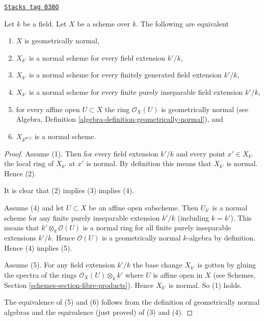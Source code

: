 \begin{lemma}
\label{varieties-lemma-geometrically-normal}
\href{https://stacks.math.columbia.edu/tag/038O}{\texttt{Stacks tag 038O}}

Let $k$ be a field.
Let $X$ be a scheme over $k$.
The following are equivalent
\begin{enumerate}
\item $X$ is geometrically normal,
\item $X_{k'}$ is a normal scheme for every field extension $k'/k$,
\item $X_{k'}$ is a normal scheme for every finitely generated field
extension $k'/k$,
\item $X_{k'}$ is a normal scheme for every finite purely inseparable
field extension $k'/k$,
\item for every affine open $U \subset X$ the ring $\mathcal{O}_X(U)$
is geometrically normal (see
Algebra, Definition \ref{algebra-definition-geometrically-normal}), and
\item $X_{k^{perf}}$ is a normal scheme.
\end{enumerate}
\end{lemma}

\begin{proof}
Assume (1). Then for every field extension $k'/k$ and
every point $x' \in X_{k'}$ the local ring of $X_{k'}$ at $x'$
is normal. By definition this means that $X_{k'}$ is normal.
Hence (2).

\medskip\noindent
It is clear that (2) implies (3) implies (4).

\medskip\noindent
Assume (4) and let $U \subset X$ be an affine open subscheme.
Then $U_{k'}$ is a normal scheme for any finite purely inseparable
extension $k'/k$ (including $k = k'$). This means that
$k' \otimes_k \mathcal{O}(U)$ is a normal ring for all
finite purely inseparable extensions $k'/k$. Hence
$\mathcal{O}(U)$ is a geometrically normal $k$-algebra by definition.
Hence (4) implies (5).

\medskip\noindent
Assume (5). For any field extension $k'/k$ the base
change $X_{k'}$ is gotten by gluing the spectra of the
rings $\mathcal{O}_X(U) \otimes_k k'$ where $U$ is affine open
in $X$ (see Schemes, Section \ref{schemes-section-fibre-products}).
Hence $X_{k'}$ is normal. So (1) holds.

\medskip\noindent
The equivalence of (5) and (6) follows from the definition
of geometrically normal algebras and the equivalence (just proved)
of (3) and (4).
\end{proof}

